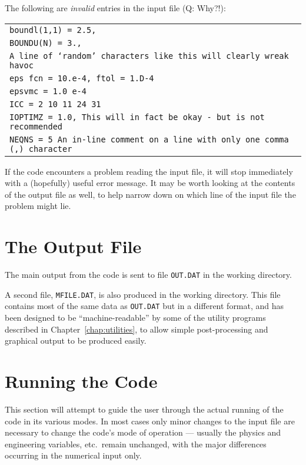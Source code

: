 \documentclass[11pt,a4paper]{report}
\begin{document}
The following are \textit{invalid}\/ entries in the input file
(Q: Why?!):
\begin{center}
\begin{tabular}{||l}
$\!\!$\texttt{boundl(1,1) = 2.5,} \\
$\!\!$\texttt{BOUNDU(N) = 3.,} \\
$\!\!$\texttt{A line of `random' characters like this will clearly wreak havoc} \\
$\!\!$\texttt{eps fcn = 10.e-4, ftol = 1.D-4} \\
$\!\!$\texttt{epsvmc = 1.0 e-4} \\
$\!\!$\texttt{ICC =   2  10  11  24  31} \\
$\!\!$\texttt{IOPTIMZ = 1.0,  This will in fact be okay - but is not recommended} \\
$\!\!$\texttt{NEQNS = 5    An in-line comment on a line with only one comma (,) character} \\
\end{tabular}
\end{center}

If the code encounters a problem reading the input file, it will stop immediately
with a (hopefully) useful error message. It may be worth looking at the
contents of the output file as well, to help narrow down on which line of the
input file the problem might lie.

\section{The Output File}

The main output from the code is sent to file \texttt{OUT.DAT} in the working
directory.

A second file, \texttt{MFILE.DAT}, is also produced in the working directory.
This file contains most of the same data as \texttt{OUT.DAT} but in a
different format, and has been designed to be ``machine-readable'' by some of
the utility programs described in Chapter~\ref{chap:utilities}, to allow
simple post-processing and graphical output to be produced easily.

\section{Running the Code}

This section will attempt to guide the user through the actual running of the
code in its various modes. In most cases only minor changes to the input file
are necessary to change the code's mode of operation --- usually the physics
and engineering variables, etc.\ remain unchanged, with the major differences
occurring in the numerical input only.
\end{document}
